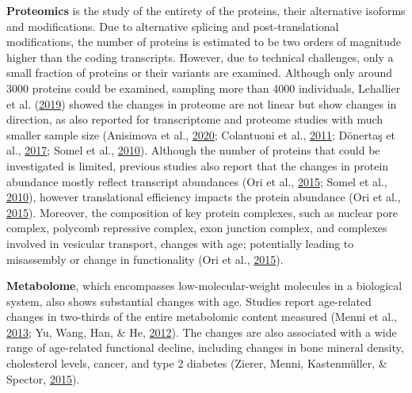 \documentclass[12pt,twoside]{unicam}
\begin{document}
\textbf{Proteomics} is the study of the entirety of the proteins, their alternative isoforms and modifications. Due to alternative splicing and post-translational modifications, the number of proteins is estimated to be two orders of magnitude higher than the coding transcripts. However, due to technical challenges, only a small fraction of proteins or their variants are examined. Although only around 3000 proteins could be examined, sampling more than 4000 individuals, Lehallier et al. (\protect\hyperlink{ref-Lehallier2019}{2019}) showed the changes in proteome are not linear but show changes in direction, as also reported for transcriptome and proteome studies with much smaller sample size (Anisimova et al., \protect\hyperlink{ref-Anisimova2020}{2020}; Colantuoni et al., \protect\hyperlink{ref-Colantuoni2011}{2011}; Dönertaş et al., \protect\hyperlink{ref-Donertas2017}{2017}; Somel et al., \protect\hyperlink{ref-Somel2010}{2010}). Although the number of proteins that could be investigated is limited, previous studies also report that the changes in protein abundance mostly reflect transcript abundances (Ori et al., \protect\hyperlink{ref-Ori2015}{2015}; Somel et al., \protect\hyperlink{ref-Somel2010}{2010}), however translational efficiency impacts the protein abundance (Ori et al., \protect\hyperlink{ref-Ori2015}{2015}). Moreover, the composition of key protein complexes, such as nuclear pore complex, polycomb repressive complex, exon junction complex, and complexes involved in vesicular transport, changes with age; potentially leading to misassembly or change in functionality (Ori et al., \protect\hyperlink{ref-Ori2015}{2015}).

\textbf{Metabolome}, which encompasses low-molecular-weight molecules in a biological system, also shows substantial changes with age. Studies report age-related changes in two-thirds of the entire metabolomic content measured (Menni et al., \protect\hyperlink{ref-Menni2013}{2013}; Yu, Wang, Han, \& He, \protect\hyperlink{ref-Yu2012}{2012}). The changes are also associated with a wide range of age-related functional decline, including changes in bone mineral density, cholesterol levels, cancer, and type 2 diabetes (Zierer, Menni, Kastenmüller, \& Spector, \protect\hyperlink{ref-Zierer2015}{2015}).
\end{document}
